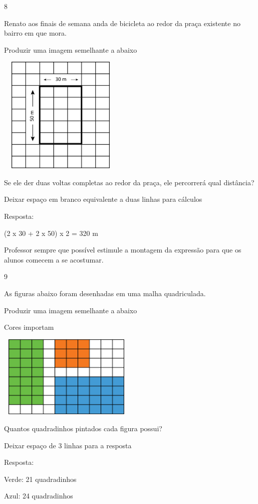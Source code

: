 \num{8}

Renato aos finais de semana anda de bicicleta ao redor da praça
existente no bairro em que mora.

Produzir uma imagem semelhante a abaixo

\includegraphics[width=2.35256in,height=2.20730in]{media/image55.png}

Se ele der duas voltas completas ao redor da praça, ele percorrerá qual
distância?

Deixar espaço em branco equivalente a duas linhas para cálculos

Resposta:

(2 x 30 + 2 x 50) x 2 = 320 m

Professor sempre que possível estimule a montagem da expressão para que
os alunos comecem a se acostumar.

\num{9}

As figuras abaixo foram desenhadas em uma malha quadriculada.

Produzir uma imagem semelhante a abaixo

Cores importam

\includegraphics[width=2.59189in,height=1.55847in]{media/image56.png}

Quantos quadradinhos pintados cada figura possui?

Deixar espaço de 3 linhas para a resposta

Resposta:

Verde: 21 quadradinhos

Azul: 24 quadradinhos

